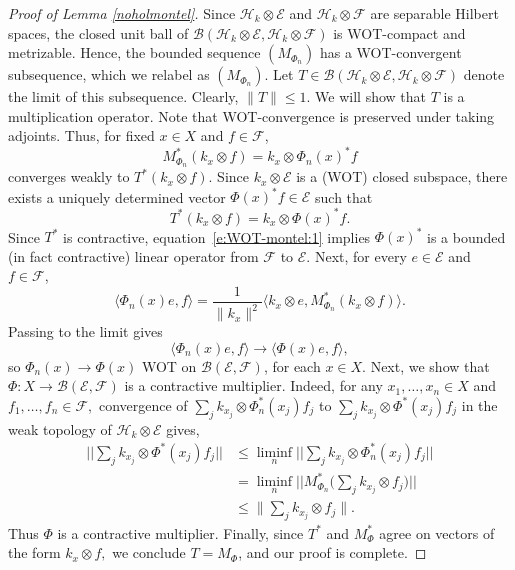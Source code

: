 \documentclass[a4paper,reqno,index]{amsart}
\numberwithin{equation}{section}
\theoremstyle{definition}
\begin{document}
\begin{proof}[Proof of Lemma \ref{noholmontel}]
Since $\mathcal{H}_k\otimes\mathcal{E}$ and $\mathcal{H}_k\otimes\mathcal{F}$ are separable Hilbert spaces, the closed unit ball of
$\mathcal{B}(\mathcal{H}_k\otimes\mathcal{E},\mathcal{H}_k\otimes\mathcal{F})$ is WOT-compact and metrizable. Hence, the bounded sequence
$(M_{\Phi_n})$ has a WOT-convergent subsequence, which we relabel as $(M_{\Phi_n})$. Let $T\in \mathcal{B}(\mathcal{H}_k\otimes\mathcal{E},\mathcal{H}_k\otimes\mathcal{F})$ denote the limit of this subsequence. Clearly, $\|T\|\le 1.$ We will show that $T$ is a multiplication operator. Note that WOT-convergence is preserved under taking adjoints. Thus, for fixed $x \in X$ and $f \in \mathcal{F}$, 
\[
M_{\Phi_n}^*(k_x \otimes f) = k_x \otimes \Phi_n(x)^* f
\]
converges weakly to $T^*(k_x \otimes f)$. Since $k_x\otimes\mathcal{E}$ is a (WOT) closed subspace, there exists a uniquely determined vector $\Phi(x)^* f \in \mathcal{E}$ 
such that 
\begin{equation}
    \label{e:WOT-montel:1}
T^*(k_x \otimes f) = k_x \otimes \Phi(x)^* f.
\end{equation}
Since $T^*$ is contractive, equation~\eqref{e:WOT-montel:1} implies $\Phi(x)^*$ is a bounded (in fact contractive)
linear operator from $\mathcal{F}$ to $\mathcal{E}.$ 
Next, 
 for every $e \in \mathcal{E}$ and $f \in \mathcal{F}$, 
\[
\langle \Phi_n(x)e, f \rangle
= \frac{1}{\|k_x\|^2}
\langle k_x \otimes e, M_{\Phi_n}^*( k_x \otimes f )\rangle.
\]
Passing to the limit gives
\[
\langle \Phi_n(x)e, f \rangle \to \langle \Phi(x)e, f \rangle,
\]
so $\Phi_n(x) \to \Phi(x)$ WOT on $\mathcal{B}(\mathcal{E}, \mathcal{F})$, for each $x \in X$.
 Next, we show that $\Phi: X\to \mathcal{B}(\mathcal{E}, \mathcal{F})$ is a contractive multiplier. Indeed, for any $x_1, \dots, x_n\in X$ and $f_1, \dots, f_n\in\mathcal{F},$ 
  convergence of $\sum_jk_{x_j}\otimes \Phi^*_{n}(x_j)f_j$  to $\sum_jk_{x_j}\otimes \Phi^*(x_j)f_j$  in the weak topology of $\mathcal{H}_k\otimes\mathcal{E}$ gives, 
\begin{align*}
\Big|\Big|\sum_jk_{x_j}\otimes \Phi^*(x_j)f_j \Big|\Big|& \le \liminf_n \Big|\Big|\sum_jk_{x_j}\otimes \Phi^*_{n}(x_j)f_j \Big|\Big| \\ 
& = \liminf_n \Big|\Big|M_{\Phi_{n}}^*\Big(\sum_jk_{x_j}\otimes f_j\Big) \Big|\Big| \\ 
& \le \| \sum_jk_{x_j}\otimes f_j\|.     
\end{align*}
Thus $\Phi$ is a contractive multiplier. Finally, since $T^*$ and $M^*_{\Phi}$ agree on vectors of the form $k_x\otimes f,$ we conclude $T=M_{\Phi}$,  and our proof is complete. 
\end{proof}
\end{document}
